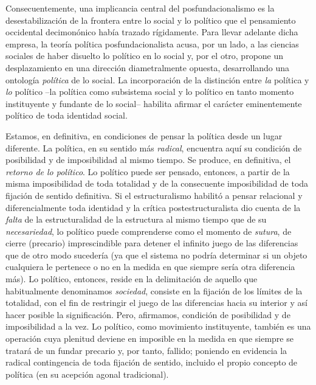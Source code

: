 Consecuentemente, una implicancia central del posfundacionalismo es la desestabilización de la frontera entre lo social y lo político que el pensamiento occidental decimonónico había trazado rígidamente. Para llevar adelante dicha empresa, la teoría política posfundacionalista acusa, por un lado, a las ciencias sociales de haber disuelto lo político en lo social y, por el otro, propone un desplazamiento en una dirección diametralmente opuesta, desarrollando una ontología \emph{política} de lo social. La incorporación de la distinción entre \emph{la} política y \emph{lo} político --la política como subsistema social y lo político en tanto momento instituyente y fundante de lo social-- habilita afirmar el carácter eminentemente político de toda identidad social.

Estamos, en definitiva, en condiciones de pensar la política desde un lugar diferente. La política, en su sentido más \emph{radical}, encuentra aquí su condición de posibilidad y de imposibilidad al mismo tiempo. Se produce, en definitiva, el \emph{retorno de lo político}. Lo político puede ser pensado, entonces, a partir de la misma imposibilidad de toda totalidad y de la consecuente imposibilidad de toda fijación de sentido definitiva. Si el estructuralismo habilitó a pensar relacional y diferencialmente toda identidad y la crítica postestructuralista dio cuenta de la \emph{falta} de la estructuralidad de la estructura al mismo tiempo que de su \emph{necesariedad}, lo político puede comprenderse como el momento de \emph{sutura}, de cierre (precario) imprescindible para detener el infinito juego de las diferencias que de otro modo sucedería (ya que el sistema no podría determinar si un objeto cualquiera le pertenece o no en la medida en que siempre sería otra diferencia más). Lo político, entonces, reside en la delimitación de aquello que habitualmente denominamos \emph{sociedad}, consiste en la fijación de los límites de la totalidad, con el fin de restringir el juego de las diferencias hacia su interior y así hacer posible la significación. Pero, afirmamos, condición de posibilidad y de imposibilidad a la vez. Lo político, como movimiento instituyente, también es una operación cuya plenitud deviene en imposible en la medida en que siempre se tratará de un fundar precario y, por tanto, fallido; poniendo en evidencia la radical contingencia de toda fijación de sentido, incluido el propio concepto de política (en su acepción agonal tradicional).

